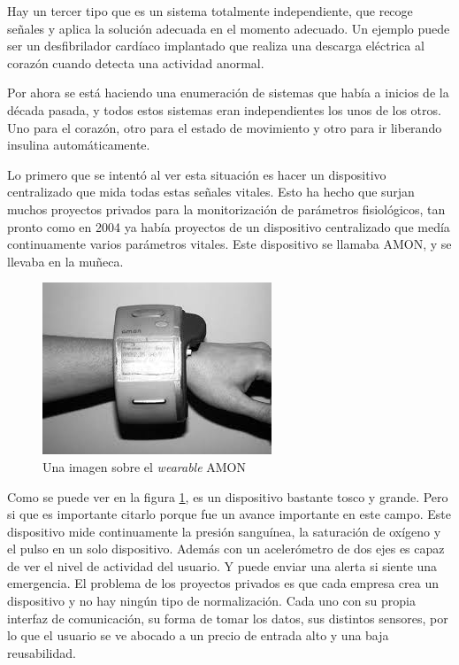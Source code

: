 \documentclass[12pt]{article}
\numberwithin{equation}{section}
\begin{document}
Hay un tercer tipo que es un sistema totalmente independiente, que recoge señales y aplica la solución adecuada en el momento adecuado. Un ejemplo puede ser un desfibrilador cardíaco implantado que realiza una descarga eléctrica al corazón cuando detecta una actividad anormal.

Por ahora se está haciendo una enumeración de sistemas que había a inicios de la década pasada, y todos estos sistemas eran independientes los unos de los otros. Uno para el corazón, otro para el estado de movimiento y otro para ir liberando insulina automáticamente.

Lo primero que se intentó al ver esta situación es hacer un dispositivo centralizado que mida todas estas señales vitales. Esto ha hecho que surjan muchos proyectos privados para la monitorización de parámetros fisiológicos, tan pronto como en 2004 ya había proyectos de un dispositivo centralizado que medía continuamente varios parámetros vitales. Este dispositivo se llamaba AMON, y se llevaba en la muñeca.

\begin{figure}[h]
    \centering
    \includegraphics{amon.jpg}
    \caption{Una imagen sobre el \textit{wearable} AMON\cite{doi:10.1258/1357633054461994}}
    \label{fig:wearablecomillas}
\end{figure}

Como se puede ver en la figura \ref{fig:wearablecomillas}, es un dispositivo bastante tosco y grande. Pero si que es importante citarlo porque fue un avance importante en este campo. Este dispositivo mide continuamente la presión sanguínea, la saturación de oxígeno y el pulso en un solo dispositivo. Además con un acelerómetro de dos ejes es capaz de ver el nivel de actividad del usuario. Y puede enviar una alerta si siente una emergencia. El problema de los proyectos privados es que cada empresa crea un dispositivo y no hay ningún tipo de normalización. Cada uno con su propia interfaz de comunicación, su forma de tomar los datos, sus distintos sensores, por lo que el usuario se ve abocado a un precio de entrada alto y una baja reusabilidad.
\end{document}
